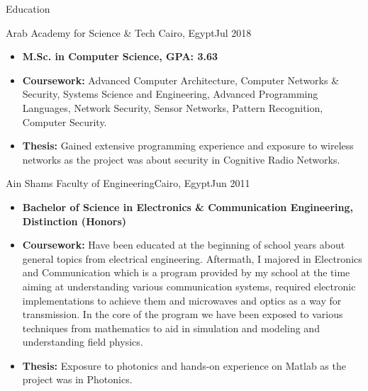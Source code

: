 \documentclass[]{mcdowellcv}
\begin{document}
	
	\makeheader
	
	
	\begin{cvsection}{Education}
		\begin{cvsubsection}{Arab Academy for Science \& Tech }{Cairo, Egypt}{Jul 2018 }
			\begin{itemize}
				\item \textbf{M.Sc. in Computer Science, GPA: 3.63}
				\item \textbf{Coursework:} Advanced Computer Architecture, Computer Networks \& Security, Systems Science and Engineering, Advanced Programming Languages, Network Security, Sensor Networks, Pattern Recognition, Computer Security.
				\item \textbf{Thesis:} Gained extensive programming experience and exposure to wireless networks as the project was about security in Cognitive Radio Networks.
			\end{itemize}
		\end{cvsubsection}
		\begin{cvsubsection}{Ain Shams Faculty of Engineering}{Cairo, Egypt}{Jun 2011}
			\begin{itemize}
				\item \textbf{Bachelor of Science in Electronics \& Communication Engineering, Distinction (Honors)}
				\item \textbf{Coursework:} Have been educated at the beginning of school years about general topics from electrical engineering.
				Aftermath, I majored in Electronics and Communication which is a program provided by my school at the time aiming at
				understanding various communication systems, required electronic implementations to achieve them and microwaves and
				optics as a way for transmission. In the core of the program we have been exposed to various techniques from mathematics
				to aid in simulation and modeling and understanding field physics.
				\item \textbf{Thesis:} Exposure to photonics and hands-on experience on Matlab as the project was in Photonics.
			\end{itemize}
		\end{cvsubsection}
	\end{cvsection}
	
\end{document}

